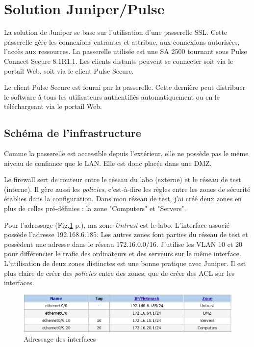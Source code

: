 \section{Solution Juniper/Pulse}
La solution de Juniper se base sur l'utilisation d'une passerelle SSL.
Cette passerelle gère les connexions entrantes et attribue, aux connexions autorisées, l'accès aux ressources.
La passerelle utilisée est une SA 2500 tournant sous Pulse Connect Secure 8.1R1.1.
Les clients distants peuvent se connecter soit via le portail Web, soit via le client Pulse Secure.

Le client Pulse Secure est fourni par la passerelle.
Cette dernière peut distribuer le software à tous les utilisateurs authentifiés automatiquement ou en le téléchargeant via le portail Web.

\subsection{Schéma de l'infrastructure}
Comme la passerelle est accessible depuis l'extérieur, elle ne possède pas le même niveau de confiance que le LAN.
Elle est donc placée dans une DMZ.

Le firewall sert de routeur entre le réseau du labo (externe) et le réseau de test (interne).
Il gère aussi les \textit{policies}, c'est-à-dire les règles entre les zones de sécurité établies dans la configuration.
Dans mon réseau de test, j'ai créé deux zones en plus de celles pré-définies : la zone "Computers" et "Servers".

Pour l'adressage (Fig.\ref{fig:if} p.\pageref{fig:if}), ma zone \textit{Untrust} est le labo. 
L'interface associé possède l'adresse 192.168.6.185.
Les autres zones font parties du réseau de test et possèdent une adresse dans le réseau 172.16.0.0/16.
J'utilise les VLAN 10 et 20 pour différencier le trafic des ordinateurs et des serveurs sur le même interface.
L'utilisation de deux zones distinctes est une bonne pratique avec Juniper. 
Il est plus claire de créer des \textit{policies} entre des zones, que de créer des ACL sur les interfaces.
\begin{figure}[ht]
	\centering
	\includegraphics[width=16cm]{juniper/interfaces.png}
	\caption{Adressage des interfaces}
	\label{fig:if}
\end{figure}

